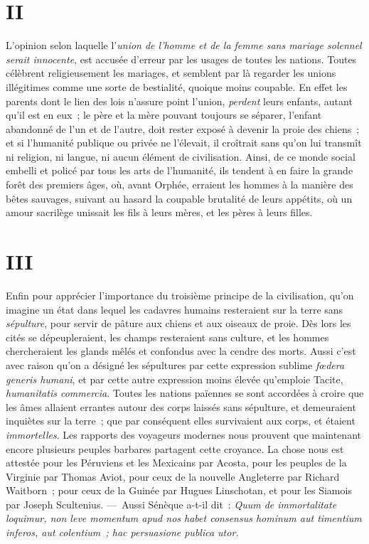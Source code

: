 \documentclass[french,twoside]{book} %
\newcommand\chapterclose{} %
\begin{document}
\section[{II}]{II}
\noindent L’opinion selon laquelle l’{\itshape union de l’homme et de la femme sans mariage solennel serait innocente}, est accusée d’erreur par les usages de toutes les nations. Toutes célèbrent religieusement les mariages, et semblent par là regarder les unions illégitimes comme une sorte de bestialité, quoique moins coupable. En effet les parents dont le lien des lois n’assure point l’union, {\itshape perdent} leurs enfants, autant qu’il est en eux ; le père et la mère pouvant toujours se séparer, l’enfant abandonné de l’un et de l’autre, doit rester exposé à devenir la proie des chiens ; et si l’humanité publique ou privée ne l’élevait, il croîtrait sans qu’on lui transmît ni religion, ni langue, ni aucun élément de civilisation. Ainsi, de ce monde social embelli et policé par tous les arts de l’humanité, ils tendent à en faire la grande forêt des premiers âges, où, avant Orphée, erraient les hommes à la manière des bêtes sauvages, suivant au hasard la coupable brutalité de leurs appétits, où un amour sacrilège unissait les fils à leurs mères, et les pères à leurs filles.
\section[{III}]{III}
\noindent Enfin pour apprécier l’importance du troisième  principe de la civilisation, qu’on imagine un état dans lequel les cadavres humains resteraient sur la terre sans {\itshape sépulture}, pour servir de pâture aux chiens et aux oiseaux de proie. Dès lors les cités se dépeupleraient, les champs resteraient sans culture, et les hommes chercheraient les glands mêlés et confondus avec la cendre des morts. Aussi c’est avec raison qu’on a désigné les sépultures par cette expression sublime \emph{{\itshape fœdera generis humani}}, et par cette autre expression moins élevée qu’emploie Tacite, \emph{{\itshape humanitatis commercia}}. Toutes les nations païennes se sont accordées à croire que les âmes allaient errantes autour des corps laissés sans sépulture, et demeuraient inquiètes sur la terre ; que par conséquent elles survivaient aux corps, et étaient {\itshape immortelles}. Les rapports des voyageurs modernes nous prouvent que maintenant encore plusieurs peuples barbares partagent cette croyance. La chose nous est attestée pour les Péruviens et les Mexicains par Acosta, pour les peuples de la Virginie par Thomas Aviot, pour ceux de la nouvelle Angleterre par Richard Waitborn ; pour ceux de la Guinée par Hugues Linschotan, et pour les Siamois par Joseph Scultenius. — Aussi Sénèque a-t-il dit : \emph{{\itshape Quum de immortalitate loquimur, non leve momentum apud nos habet consensus hominum aut timentium inferos, aut colentium ; hac persuasione publica utor.}}
\chapterclose
\end{document}
